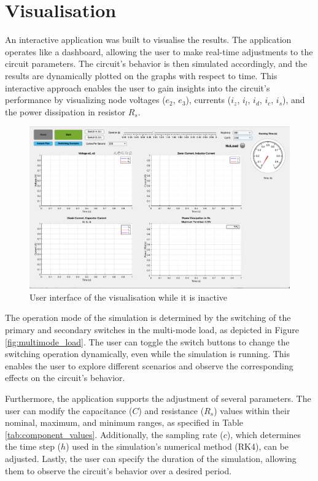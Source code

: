 \section{Visualisation}
An interactive application was built to visualise the results. The application operates like a dashboard, allowing the user to make real-time adjustments to the circuit parameters. The circuit's behavior is then simulated accordingly, and the results are dynamically plotted on the graphs with respect to time. This interactive approach enables the user to gain insights into the circuit's performance by visualizing node voltages ($e_2$, $e_3$), currents ($i_z$, $i_l$, $i_d$, $i_c$, $i_s$), and the power dissipation in resistor $R_s$.

\begin{figure}[H]
     \centering
     \includegraphics[width=15cm]{graphics/visualisation/inactive_ui}
     \caption{User interface of the visualisation while it is inactive}
\end{figure}
The operation mode of the simulation is determined by the switching of the primary and secondary switches in the multi-mode load, as depicted in Figure \ref{fig:multimode_load}. The user can toggle the switch buttons to change the switching operation dynamically, even while the simulation is running. This enables the user to explore different scenarios and observe the corresponding effects on the circuit's behavior.

\leavevmode\newline
Furthermore, the application supports the adjustment of several parameters. The user can modify the capacitance ($C$) and resistance ($R_s$) values within their nominal, maximum, and minimum ranges, as specified in Table \ref{tab:component_values}. Additionally, the sampling rate ($c$), which determines the time step ($h$) used in the simulation's numerical method (RK4), can be adjusted. Lastly, the user can specify the duration of the simulation, allowing them to observe the circuit's behavior over a desired period.

